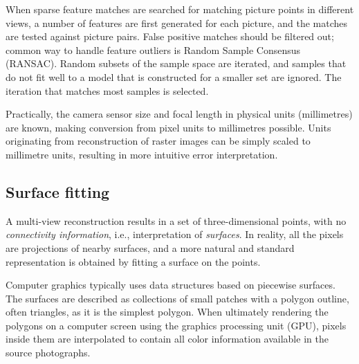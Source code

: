 
When sparse feature matches are searched for matching picture points in different views, a number of features are first generated for each picture, and the matches are tested against picture pairs.
False positive matches should be filtered out; common way to handle feature outliers is Random Sample Consensus (RANSAC).
Random subsets of the sample space are iterated, and samples that do not fit well to a model that is constructed for a smaller set are ignored.
The iteration that matches most samples is selected. \cite{hartley03multiview}


Practically, the camera sensor size and focal length in physical units (millimetres) are known, making conversion from pixel units to millimetres possible.
Units originating from reconstruction of raster images can be simply scaled to millimetre units, resulting in more intuitive error interpretation.




\subsection{Surface fitting} %

A multi-view reconstruction results in a set of three-dimensional points, with no \emph{connectivity information}, i.e., interpretation of \emph{surfaces}.
In reality, all the pixels are projections of nearby surfaces, and a more natural and standard representation is obtained by fitting a surface on the points.

Computer graphics typically uses data structures based on piecewise surfaces.
The surfaces are described as collections of small patches with a polygon outline, often triangles, as it is the simplest polygon.
When ultimately rendering the polygons on a computer screen using the graphics processing unit (GPU), pixels inside them are interpolated to contain all color information available in the source photographs.

